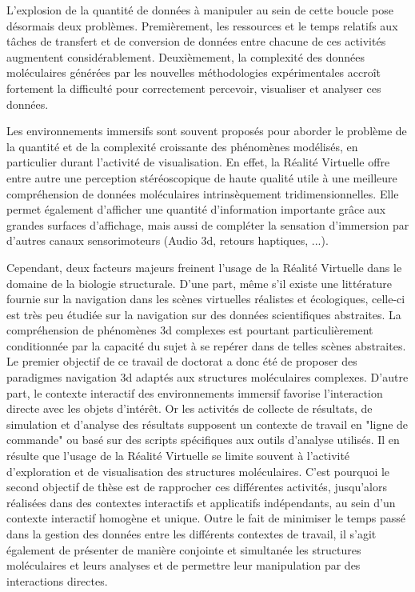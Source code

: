 L’explosion de la quantité de données à manipuler au sein de cette boucle pose désormais deux problèmes. Premièrement, les ressources et le temps relatifs aux tâches de transfert et de conversion de données entre chacune de ces activités augmentent considérablement. Deuxièmement, la complexité des données moléculaires générées par les nouvelles méthodologies expérimentales accroît fortement la difficulté pour correctement percevoir, visualiser et analyser ces données.

Les environnements immersifs sont souvent proposés pour aborder le problème de la quantité et de la complexité croissante des phénomènes modélisés, en particulier durant l’activité de visualisation. En effet, la Réalité Virtuelle offre entre autre une perception stéréoscopique de haute qualité utile à une meilleure compréhension de données moléculaires intrinsèquement tridimensionnelles. Elle permet également d’afficher une quantité d’information importante grâce aux grandes surfaces d’affichage, mais aussi de compléter la sensation d’immersion par d’autres canaux sensorimoteurs (Audio 3d, retours haptiques, ...).

Cependant, deux facteurs majeurs freinent l’usage de la Réalité Virtuelle dans le domaine de la biologie structurale. D’une part, même s’il existe une littérature fournie sur la navigation dans les scènes virtuelles réalistes et écologiques, celle-ci est très peu étudiée sur la navigation sur des données scientifiques abstraites. La compréhension de phénomènes 3d complexes est pourtant particulièrement conditionnée par la capacité du sujet à se repérer dans de telles scènes abstraites. Le premier objectif de ce travail de doctorat a donc été de proposer des paradigmes navigation 3d adaptés aux structures moléculaires complexes. D’autre part, le contexte interactif des environnements immersif favorise l’interaction directe avec les objets d’intérêt. Or les activités de collecte de résultats, de simulation et d’analyse des résultats supposent un contexte de travail en "ligne de commande" ou basé sur des scripts spécifiques aux outils d’analyse utilisés. Il en résulte que l’usage de la Réalité Virtuelle se limite souvent à l’activité d’exploration et de visualisation des structures moléculaires. C’est pourquoi le second objectif de thèse est de rapprocher ces différentes activités, jusqu’alors réalisées dans des contextes interactifs et applicatifs indépendants, au sein d’un contexte interactif homogène et unique. Outre le fait de minimiser le temps passé dans la gestion des données entre les différents contextes de travail, il s’agit également de présenter de manière conjointe et simultanée les structures moléculaires et leurs analyses et de permettre leur manipulation par des interactions directes.

